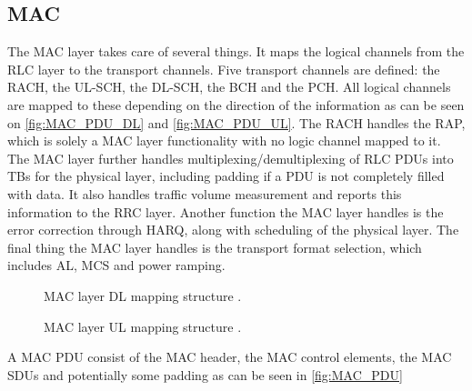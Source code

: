 \subsection{MAC}

The \gls{MAC} layer takes care of several things. It maps the logical channels from the RLC layer to the transport channels. Five transport channels are defined: the \gls{RACH}, the \gls{UL-SCH}, the \gls{DL-SCH}, the \gls{BCH} and the \gls{PCH}. All logical channels are mapped to these depending on the direction of the information as can be seen on \autoref{fig:MAC_PDU_DL} and \autoref{fig:MAC_PDU_UL}. The \gls{RACH} handles the \gls{RAP}, which is solely a \gls{MAC} layer functionality with no logic channel mapped to it. The \gls{MAC} layer further handles multiplexing/demultiplexing of \gls{RLC} \gls{PDU}s into \gls{TB}s for the physical layer, including padding if a \gls{PDU} is not completely filled with data. It also handles traffic volume measurement and reports this information to the \gls{RRC} layer. Another function the \gls{MAC} layer handles is the error correction through \gls{HARQ}, along with scheduling of the physical layer. The final thing the \gls{MAC} layer handles is the transport format selection, which includes \gls{AL}, \gls{MCS} and power ramping.  

\captionsetup{belowskip=0em}
\begin{minipage}{0.48\textwidth}
    \begin{figure}[H]
    \centering
    \resizebox{\textwidth}{!}{
    }
    \caption{\gls{MAC} layer \gls{DL} mapping structure \citep[Sec. 6.3]{book_LTE_for_UMTS}.}
    \label{fig:MAC_PDU_DL}
    \end{figure}
\end{minipage}
\begin{minipage}{0.48\textwidth}
    \begin{figure}[H]
    \centering
    \resizebox{\textwidth}{!}{
    }
    \caption{\gls{MAC} layer \gls{UL} mapping structure \citep[Sec. 6.3]{book_LTE_for_UMTS}.}
    \label{fig:MAC_PDU_UL}
    \end{figure}
\end{minipage}
\captionsetup{belowskip=-1.5em}

A \gls{MAC} \gls{PDU} consist of the \gls{MAC} header, the \gls{MAC} control elements, the \gls{MAC} \gls{SDU}s and potentially some padding as can be seen in \autoref{fig:MAC_PDU}

